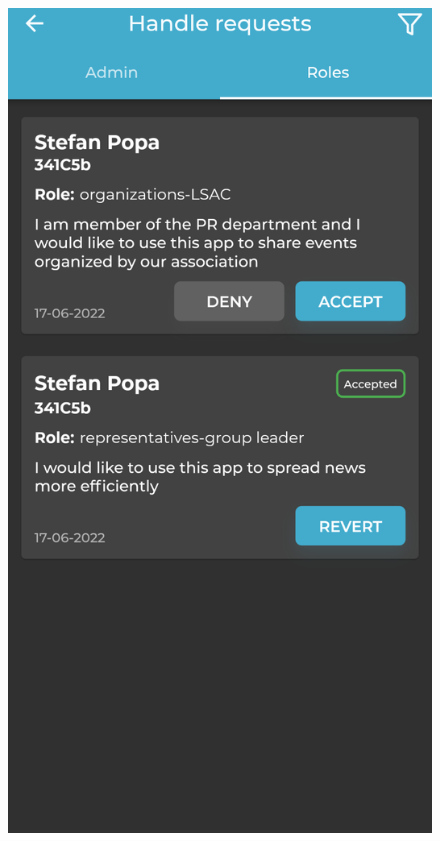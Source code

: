 \begin{figure}[!ht]
\begin{minipage}[b]{0.32\textwidth}
        \label{4:fig:request-editing-permissions}
    \end{minipage}
    \hfill
    \begin{minipage}[b]{0.32\textwidth}
        \captionsetup{justification=centering}
        \includegraphics[width=\textwidth]{figures/app/final/handle-requests-completed-final.png}

\end{minipage}
\end{figure}

